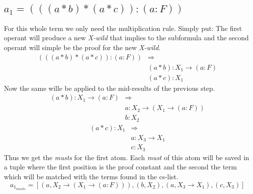 \subsection[First atom]{$a_1 = (((a * b)*(a * c)):(a:F))$}
%
For this whole term we only need the multiplication rule. Simply put: The first operant will produce a new \emph{X-wild} that implies to the subformula and the second operant will simple be the proof for the new \emph{X-wild}.
\begin{equation}\label{example_atom1_must}
\begin{split}
	(((a * b)*(a * c)):(a:F)) & \Rightarrow \\
	& (a * b) : X_1 \rightarrow (a:F) \\
	& (a * c) : X_1
\end{split}
\end{equation}
Now the same wille be applied to the mid-results of the previous step.
\begin{equation}\label{example_atom1_must2}
\begin{split}
	(a * b) : X_1 \rightarrow (a:F) & \Rightarrow \\
	& a: X_2 \rightarrow (X_1 \rightarrow (a:F)) \\
	& b: X_2
\end{split}
\end{equation}
\begin{equation}\label{example_atom1_must3}
\begin{split}
	(a * c) : X_1 & \Rightarrow \\
	& a: X_3 \rightarrow X_1 \\
	& c: X_3
\end{split}
\end{equation}
Thus we get the \emph{musts} for the first atom. Each \emph{must} of this atom will be saved in a tuple where the first position is the proof constant and the second the term which will be matched with the terms found in the cs-list.
\begin{equation}
	a_1_{musts} = [(a, X_2 \rightarrow (X_1 \rightarrow (a:F))), (b, X_2), (a, X_3 \rightarrow X_1), (c, X_3)]
\end{equation}

%
%
